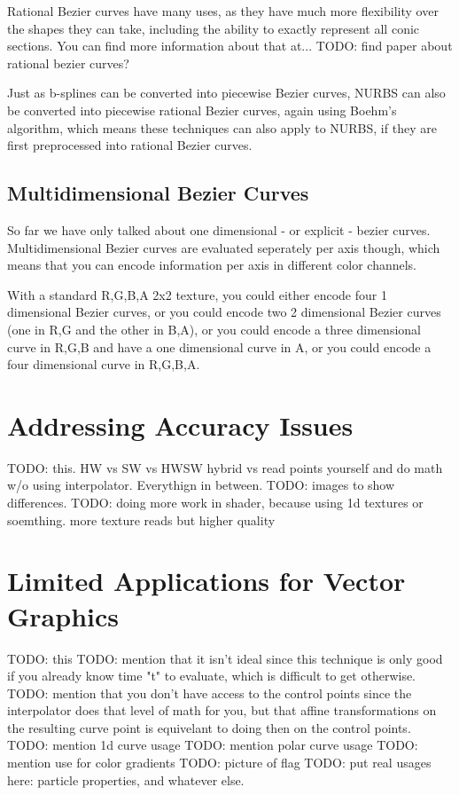\documentclass{jcgt}
\begin{document}
Rational Bezier curves have many uses, as they have much more flexibility over the shapes they can take, including the ability to exactly represent all conic sections.  You can find more information about that at...
TODO: find paper about rational bezier curves?

Just as b-splines can be converted into piecewise Bezier curves, NURBS can also be converted into piecewise rational Bezier curves, again using Boehm's algorithm, which means these techniques can also apply to NURBS, if they are first preprocessed into rational Bezier curves.

\subsection{Multidimensional Bezier Curves}

So far we have only talked about one dimensional - or explicit - bezier curves.  Multidimensional Bezier curves are evaluated seperately per axis though, which means that you can encode information per axis in different color channels.

With a standard R,G,B,A 2x2 texture, you could either encode four 1 dimensional Bezier curves, or you could encode two  2 dimensional Bezier curves (one in R,G and the other in B,A), or you could encode a three dimensional curve in R,G,B and have a one dimensional curve in A, or you could encode a four dimensional curve in R,G,B,A.

\section{Addressing Accuracy Issues}
\label{sec:addressingaccuracyissues}

TODO: this. HW vs SW vs HWSW hybrid vs read points yourself and do math w/o using interpolator. Everythign in between.
TODO: images to show differences.
TODO: doing more work in shader, because using 1d textures or soemthing.  more texture reads but higher quality

\section{Limited Applications for Vector Graphics}
\label{sec:limitedapplicationsforvectorgraphics}

TODO: this
TODO: mention that it isn't ideal since this technique is only good if you already know time "t" to evaluate, which is difficult to get otherwise.
TODO: mention that you don't have access to the control points since the interpolator does that level of math for you, but that affine transformations on the resulting curve point is equivelant to doing then on the control points.
TODO: mention 1d curve usage
TODO: mention polar curve usage
TODO: mention use for color gradients
TODO: picture of flag
TODO: put real usages here: particle properties, and whatever else.
\end{document}
